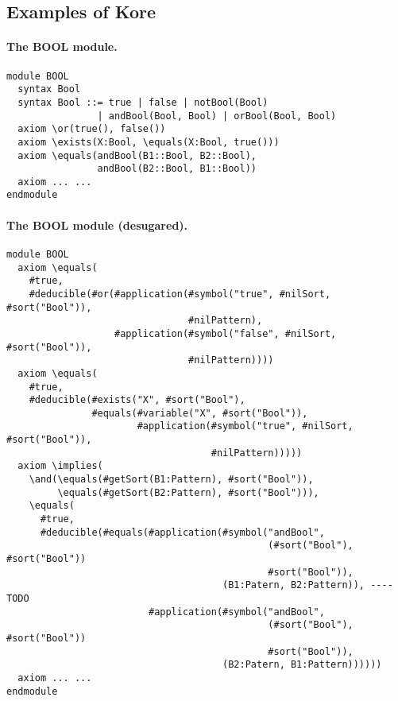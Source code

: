 \documentclass[UTF8,11pt]{article}
\theoremstyle{plain}
\theoremstyle{definition}
\theoremstyle{remark}
\begin{document}
\subsection{Examples of Kore}
\label{sec:examples-of-kore}


\paragraph{The {\small BOOL} module.}\quad
\begin{Verbatim}[fontsize=\small]
module BOOL
  syntax Bool
  syntax Bool ::= true | false | notBool(Bool)
                | andBool(Bool, Bool) | orBool(Bool, Bool)
  axiom \or(true(), false())
  axiom \exists(X:Bool, \equals(X:Bool, true()))
  axiom \equals(andBool(B1::Bool, B2::Bool), 
                andBool(B2::Bool, B1::Bool))
  axiom ... ...
endmodule
\end{Verbatim}

\paragraph{The {\small BOOL} module (desugared).}\quad
\begin{Verbatim}[fontsize=\small]
module BOOL
  axiom \equals(
    #true,
    #deducible(#or(#application(#symbol("true", #nilSort, #sort("Bool")),
                                #nilPattern), 
                   #application(#symbol("false", #nilSort, #sort("Bool")),
                                #nilPattern))))
  axiom \equals(
    #true,
    #deducible(#exists("X", #sort("Bool"), 
               #equals(#variable("X", #sort("Bool")), 
                       #application(#symbol("true", #nilSort, #sort("Bool")),
                                    #nilPattern)))))
  axiom \implies(
    \and(\equals(#getSort(B1:Pattern), #sort("Bool")), 
         \equals(#getSort(B2:Pattern), #sort("Bool"))),
    \equals(
      #true,
      #deducible(#equals(#application(#symbol("andBool", 
                                              (#sort("Bool"), #sort("Bool"))
                                              #sort("Bool")), 
                                      (B1:Patern, B2:Pattern)), ---- TODO
                         #application(#symbol("andBool", 
                                              (#sort("Bool"), #sort("Bool"))
                                              #sort("Bool")), 
                                      (B2:Patern, B1:Pattern))))))
  axiom ... ...
endmodule
\end{Verbatim}
\end{document}
